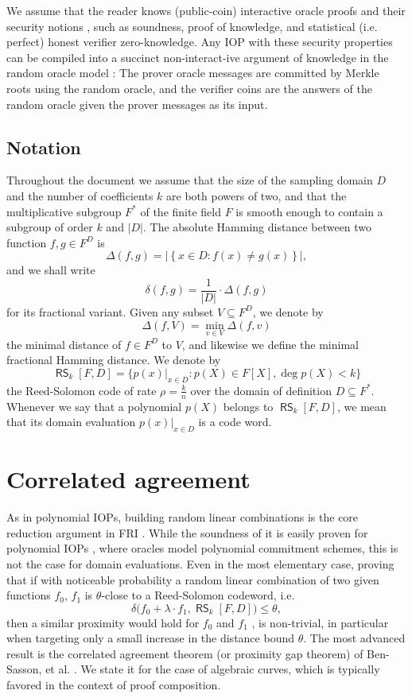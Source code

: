 \documentclass[11pt,article,oneside]{memoir}
\theoremstyle{definition}
\theoremstyle{remark}
\DeclareMathOperator{\RS}{\mathsf{RS}}
\begin{document}
We assume that the reader knows (public-coin) interactive oracle proofs and their security notions  \cite{IOPs}, such as soundness, proof of knowledge, and statistical (i.e. perfect) honest verifier zero-knowledge. 
Any IOP with these security properties can be compiled into a succinct non-interact-ive argument of knowledge in the random oracle model \cite{IOPs}:
The prover oracle messages are committed by Merkle roots using the random oracle, and the verifier coins are the answers of the random oracle given the prover messages as its input.


\section{Notation}
Throughout the document we assume that the size of the sampling domain $D$ and the number of coefficients $k$ are both powers of two, and that the multiplicative subgroup $F^*$ of the finite field $F$ is smooth enough to contain a subgroup of order $k$ and $|D|$. 
The absolute Hamming distance between two function $f,g\in F^D$ is
\begin{equation*}
\Delta(f, g) = \big|\left\{x\in D: f(x)\neq g(x)\right\}\big|,
\end{equation*}
and we shall write 
\[
\delta(f, g) = \frac{1}{|D|}\cdot \Delta(f,g)
\] 
for its fractional variant.
Given any subset $V\subseteq F^D$, we denote by
\[
\Delta(f, V) = \min_{v\in V} \Delta(f,v)
\]
the minimal distance of $f\in F^D$ to $V$, and likewise we define the minimal fractional Hamming distance.
We denote by
\begin{equation*}
\RS_k[F,D] = \big\{ \left.p(x)\right|_{x\in D} : p(X)\in F[X], \deg p(X) < k\big\}
\end{equation*}
the Reed-Solomon code of rate $\rho = \frac{k}{n}$ over the domain of definition $D\subseteq F^*$. 
Whenever we say that a polynomial $p(X)$ belongs to $\RS_k[F,D]$, we mean that its domain evaluation $p(x)|_{x\in D}$ is a code word. 
 

\chapter{Correlated agreement}

As in polynomial IOPs, building random linear combinations is the core reduction argument in FRI . 
While the soundness of it is easily proven for polynomial IOPs \cite{DARK}, where oracles model polynomial commitment schemes, this is not the case for domain evaluations. 
Even in the most elementary case, proving that if with noticeable probability a random linear combination  of two  given functions $f_0$, $f_1$ is $\theta$-close to a Reed-Solomon codeword, i.e.
\[
\delta\big(f_0 + \lambda\cdot f_1, \RS_k[F,D]\big) \leq \theta,
\]
 then a similar proximity  would hold for $f_0$ and $f_1$ , is non-trivial, in particular when targeting only a small increase in the distance bound $\theta$.  
The most advanced result is the correlated agreement theorem (or proximity gap theorem) of Ben-Sasson, et al. \cite{ProximityGaps}.
We state it for the case of algebraic curves, which is typically favored in the context of proof composition.
\end{document}
